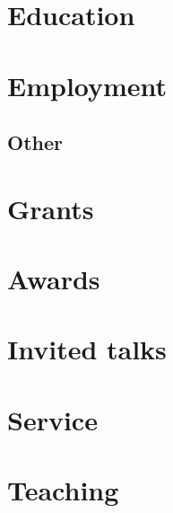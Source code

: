 \documentclass[english, 9pt, a4paper]{article}
\title{}
\begin{document}
\maketitle

\section*{Education}


\section*{Employment}


\begin{publications}
\section{Other}
\end{publications}

\section*{Grants}


\section*{Awards}


\section*{Invited talks}


\section*{Service}


\section*{Teaching}

\end{document}
